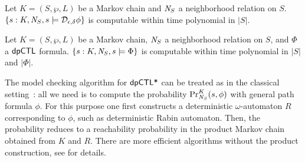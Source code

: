 \begin{proposition}
  Let $K = (S, \wp, L)$ be a Markov chain and $\neighbor{S}$ a
  neighborhood relation on $S$.
  $\{ s : K, \neighbor{S}, s \models \dpriv{\epsilon}{\delta} \phi \}$ is
  computable within time polynomial in $|S|$.
\end{proposition}

\begin{corollary}
  Let $K = (S, \wp, L)$ be a Markov chain, $\neighbor{S}$ a
  neighborhood relation on $S$, and $\Phi$ a $\dpCTL$
  formula. $\{ s : K, \neighbor{S}, s \models \Phi \}$ is
  computable within time polynomial in $|S|$ and $|\Phi|$.
\end{corollary}

The model checking algorithm for $\dpCTLstar$ can be treated as in the classical setting~\cite{BK:08:PMC}:  all we need is to  compute the  probability
  $\myPr{s}{K}{\neighbor{S}}{\phi}$ with general path formula $\phi$. For this purpose one first constructs a deterministic $\omega$-automaton $R$ corresponding to $\phi$, such as deterministic Rabin automaton. Then, the probability reduces to a
  reachability probability in the product Markov chain obtained from $K$ and $R$. There are more efficient algorithms without the product construction, see \cite{CY95,CSS03,BaierKKKMW16} for details.
